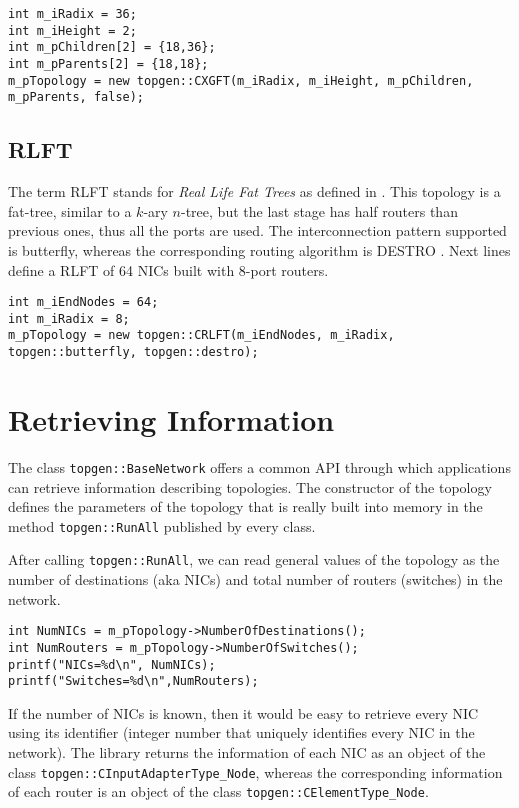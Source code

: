 \documentclass[12pt,onecolumn]{report}
\begin{document}
\begin{lstlisting}
int m_iRadix = 36;
int m_iHeight = 2;
int m_pChildren[2] = {18,36};
int m_pParents[2] = {18,18};
m_pTopology = new topgen::CXGFT(m_iRadix, m_iHeight, m_pChildren, m_pParents, false);
\end{lstlisting}

\subsection*{RLFT}

The term RLFT stands for \textit{Real Life Fat Trees} as defined in \cite{Zahavi}. This topology is a fat-tree, similar to a $k$-ary $n$-tree, but the last stage has half routers than previous ones, thus all the ports are used. The interconnection pattern supported is butterfly, whereas the corresponding routing algorithm is DESTRO \cite{Crispin}. Next lines define a RLFT of 64 NICs built with 8-port routers.

\begin{lstlisting}
int m_iEndNodes = 64;
int m_iRadix = 8;
m_pTopology = new topgen::CRLFT(m_iEndNodes, m_iRadix, topgen::butterfly, topgen::destro);
\end{lstlisting}


\section{Retrieving Information}

The class \verb|topgen::BaseNetwork| offers a common API through which applications can retrieve information describing topologies. The constructor of the topology defines the parameters of the topology that is really built into memory in the method \verb|topgen::RunAll| published by every class.

After calling \verb|topgen::RunAll|, we can read general values of the topology  as the number of destinations (aka NICs) and total number of routers (switches) in the network.

\begin{lstlisting}
int NumNICs = m_pTopology->NumberOfDestinations();
int NumRouters = m_pTopology->NumberOfSwitches();
printf("NICs=%d\n", NumNICs);
printf("Switches=%d\n",NumRouters);
\end{lstlisting}

If the number of NICs is known, then it would be easy to retrieve every NIC using its identifier (integer number that uniquely identifies every NIC in the network). The library returns the information of each NIC as an object of the class \verb|topgen::CInputAdapterType_Node|, whereas the corresponding information of each router is an object of the class \verb|topgen::CElementType_Node|.
\end{document}
